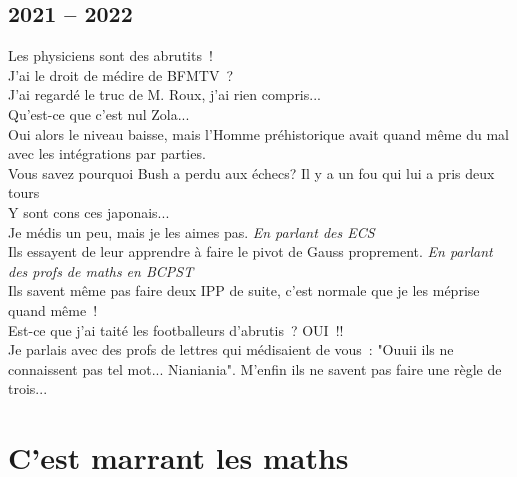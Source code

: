 \documentclass[french, a4paper, openany]{book}
\begin{document}
	\subsection*{2021 -- 2022}
		\noindent \og Les physiciens sont des abrutits~! \fg \\
		\og J'ai le droit de médire de BFMTV~? \fg \\
		\og J'ai regardé le truc de M. Roux, j'ai rien compris... \fg \\
		\og Qu'est-ce que c'est nul Zola... \fg \\
		\og Oui alors le niveau baisse, mais l'Homme préhistorique avait quand même du mal avec les intégrations par parties. \fg \\
		\og Vous savez pourquoi Bush a perdu aux échecs? Il y a un fou qui lui a pris deux tours \fg \\
		\og Y sont cons ces japonais... \fg \\
		\og Je médis un peu, mais je les aimes pas. \fg \emph{En parlant des ECS}\\
		\og Ils essayent de leur apprendre à faire le pivot de Gauss proprement. \fg \emph{En parlant des profs de maths en BCPST} \\
		\og Ils savent même pas faire deux IPP de suite, c'est normale que je les méprise quand même~! \fg \\
		\og Est-ce que j'ai taité les footballeurs d'abrutis~? OUI~!! \fg \\
		\og Je parlais avec des profs de lettres qui médisaient de vous~: "Ouuii ils ne connaissent pas tel mot... Nianiania". M'enfin ils ne savent pas faire une règle de trois... \fg \\

\section*{C'est marrant les maths}
\end{document}
